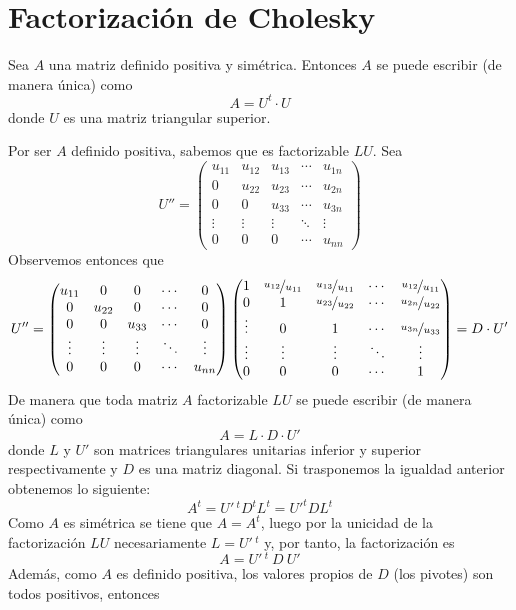 \section{Factorización de Cholesky}
\begin{prop}
Sea $A$ una matriz definido positiva y simétrica. Entonces $A$ se puede escribir (de manera única) como
$$A=U^t\cdot U$$
donde  $U$ es una matriz triangular superior.
\end{prop}
\begin{dem}
Por ser $A$ definido positiva, sabemos que es factorizable $LU$. Sea 
$$U''=\begin{pmatrix}
    u_{11}&u_{12}&u_{13}&\cdots &u_{1n}\\
    0&u_{22}&u_{23}&\cdots &u_{2n}\\
    0 & 0&u_{33}&\cdots&u_{3n}\\
    \vdots&\vdots &\vdots&\ddots&\vdots \\
    0&0 &0&\cdots&u_{nn}
\end{pmatrix}$$
Observemos entonces que
$$U''=\begin{pmatrix}
    u_{11}&0&0&\cdots &0\\
    0&u_{22}&0&\cdots &0\\
    0 & 0&u_{33}&\cdots&0\\
    \vdots&\vdots &\vdots&\ddots&\vdots \\
    0&0 &0&\cdots&u_{nn}
    \end{pmatrix}\begin{pmatrix}
    1 & \nicefrac{u_{12}}{u_{11}}& \nicefrac{u_{13}}{u_{11}} &\cdots & \nicefrac{u_{12}}{u_{11}}\\
    0&1 &\nicefrac{u_{23}}{u_{22}}&\cdots &\nicefrac{u_{2n}}{u_{22}}\\
    \vdots & 0&1&\cdots&\nicefrac{u_{3n}}{u_{33}}\\
    \vdots&\vdots &\vdots&\ddots&\vdots \\
    0&0 &0&\cdots&1
\end{pmatrix}=D\cdot U'$$
De manera que toda matriz $A$ factorizable $LU$ se puede escribir (de manera única) como
$$A=L\cdot D\cdot U'$$
donde $L$ y $U'$ son matrices triangulares unitarias inferior y superior respectivamente y $D$ es una matriz diagonal. Si trasponemos la igualdad anterior obtenemos lo siguiente:
$$A^t=U'\,^t D^t L^t=U'^t D L^t$$
Como $A$ es simétrica se tiene que $A=A^t$, luego por la unicidad de la factorización $LU$ necesariamente $L=U'\,^t$ 
y, por tanto, la factorización es 
$$ \; A=U'\,^t \: D \: U' \; $$
Además, como $A$ es definido positiva, los valores propios de $D$ (los pivotes) son todos positivos, entonces

\end{dem}
